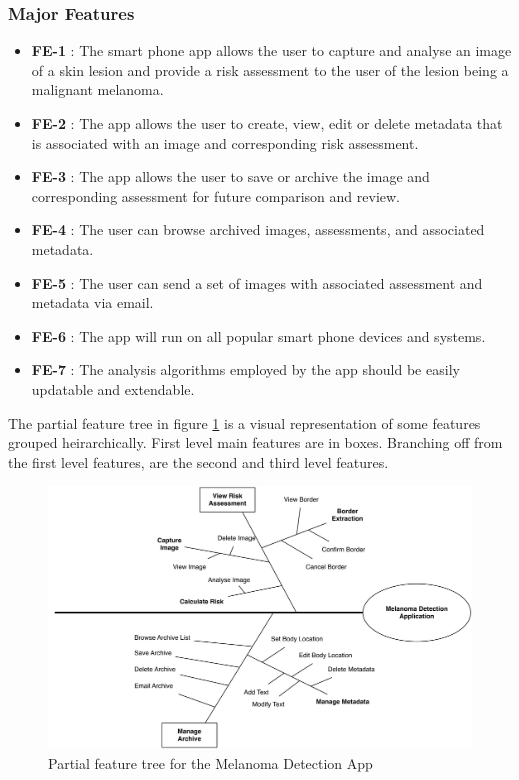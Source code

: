     \subsubsection{Major Features}
        \noindent
        \begin{itemize}[leftmargin=*]
            \item[]  \textbf{FE-1} : The smart phone app allows the user to capture and analyse an image of a skin lesion and provide a risk assessment to the user of the lesion being a malignant melanoma.

            \item[] \textbf{FE-2} : The app allows the user to create, view, edit or delete metadata that is associated with an image and corresponding risk assessment.

            \item[] \textbf{FE-3} : The app allows the user to save or archive the image and corresponding assessment for future comparison and review.

            \item[] \textbf{FE-4} : The user can browse archived images, assessments, and associated metadata.

            \item[] \textbf{FE-5} : The user can send a set of images with associated assessment and metadata via email.

            \item[] \textbf{FE-6} : The app will run on all popular smart phone devices and systems.

            \item[] \textbf{FE-7} : The analysis algorithms employed by the app should be easily updatable and extendable.
        \end{itemize}

        The partial feature tree in figure \ref{fig:partial_feature_tree} is a visual representation of some features grouped heirarchically. First level main features are in boxes. Branching off from the first level features, are the second and third level features.

        \begin{figure}[H]
            \centering
            \includegraphics[width=\textwidth]{assets/requirements/PartialFeatureTree.pdf}
            \caption{Partial feature tree for the Melanoma Detection App}
            \label{fig:partial_feature_tree}
        \end{figure}


